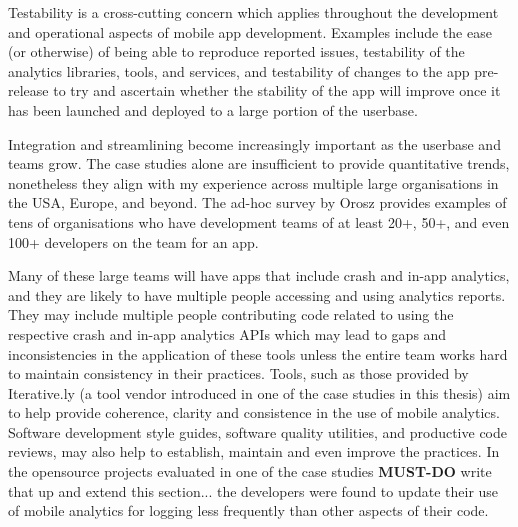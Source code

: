 Testability is a cross-cutting concern which applies throughout the development and operational aspects of mobile app development. Examples include the ease (or otherwise) of being able to reproduce reported issues, testability of the analytics libraries, tools, and services, and testability of changes to the app pre-release to try and ascertain whether the stability of the app will improve once it has been launched and deployed to a large portion of the userbase.






Integration and streamlining become increasingly important as the userbase and teams grow. The case studies alone are insufficient to provide quantitative trends, nonetheless they align with my experience across multiple large organisations in the USA, Europe, and beyond. The ad-hoc survey by Orosz provides examples of tens of organisations who have development teams of at least 20+, 50+, and even 100+ developers on the team for an app.


Many of these large teams will have apps that include crash and in-app analytics, and they are likely to have multiple people accessing and using analytics reports. They may include multiple people contributing code related to using the respective crash and in-app analytics APIs which may lead to gaps and inconsistencies in the application of these tools unless the entire team works hard to maintain consistency in their practices. Tools, such as those provided by Iterative.ly (a tool vendor introduced in one of the case studies in this thesis) aim to help provide coherence, clarity and consistence in the use of mobile analytics. Software development style guides, software quality utilities, and productive code reviews, may also help to establish, maintain and even improve the practices. In the opensource projects evaluated in one of the case studies \textbf{MUST-DO} write that up and extend this section... the developers were found to update their use of mobile analytics for logging less frequently than other aspects of their code.


